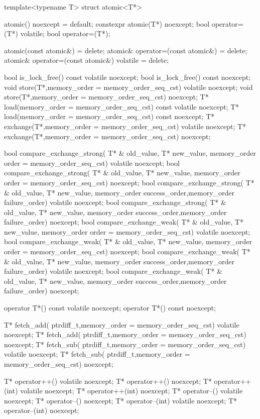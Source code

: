 \begin{cpp}
template<typename T>
struct atomic<T*>
{
  atomic() noexcept = default;
  constexpr atomic(T*) noexcept;
  bool operator=(T*) volatile;
  bool operator=(T*);

  atomic(const atomic&) = delete;
  atomic& operator=(const atomic&) = delete;
  atomic& operator=(const atomic&) volatile = delete;

  bool is_lock_free() const volatile noexcept;
  bool is_lock_free() const noexcept;
  void store(T*,memory_order = memory_order_seq_cst) volatile noexcept;
  void store(T*,memory_order = memory_order_seq_cst) noexcept;
  T* load(memory_order = memory_order_seq_cst) const volatile noexcept;
  T* load(memory_order = memory_order_seq_cst) const noexcept;
  T* exchange(T*,memory_order = memory_order_seq_cst) volatile noexcept;
  T* exchange(T*,memory_order = memory_order_seq_cst) noexcept;

  bool compare_exchange_strong(
      T* & old_value, T* new_value,
      memory_order order = memory_order_seq_cst) volatile noexcept;
  bool compare_exchange_strong(
      T* & old_value, T* new_value,
      memory_order order = memory_order_seq_cst) noexcept;
  bool compare_exchange_strong(
      T* & old_value, T* new_value,
      memory_order success_order,memory_order failure_order)
      volatile noexcept;
  bool compare_exchange_strong(
      T* & old_value, T* new_value,
      memory_order success_order,memory_order failure_order) noexcept;
  bool compare_exchange_weak(
      T* & old_value, T* new_value,
      memory_order order = memory_order_seq_cst) volatile noexcept;
  bool compare_exchange_weak(
      T* & old_value, T* new_value,
      memory_order order = memory_order_seq_cst) noexcept;
  bool compare_exchange_weak(
      T* & old_value, T* new_value,
      memory_order success_order,memory_order failure_order)
      volatile noexcept;
  bool compare_exchange_weak(
      T* & old_value, T* new_value,
      memory_order success_order,memory_order failure_order) noexcept;

  operator T*() const volatile noexcept;
  operator T*() const noexcept;

  T* fetch_add(
      ptrdiff_t,memory_order = memory_order_seq_cst) volatile noexcept;
  T* fetch_add(
      ptrdiff_t,memory_order = memory_order_seq_cst) noexcept;
  T* fetch_sub(
      ptrdiff_t,memory_order = memory_order_seq_cst) volatile noexcept;
  T* fetch_sub(
      ptrdiff_t,memory_order = memory_order_seq_cst) noexcept;

  T* operator++() volatile noexcept;
  T* operator++() noexcept;
  T* operator++(int) volatile noexcept;
  T* operator++(int) noexcept;
  T* operator--() volatile noexcept;
  T* operator--() noexcept;
  T* operator--(int) volatile noexcept;
  T* operator--(int) noexcept;

}
\end{cpp}
